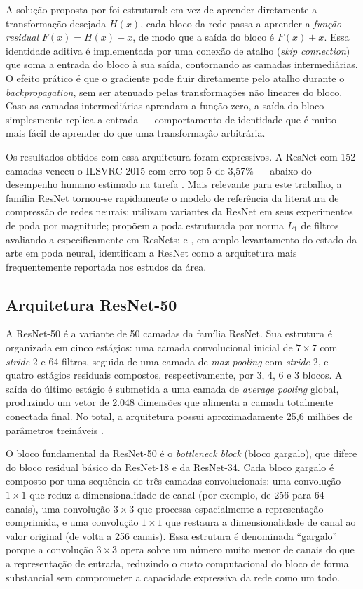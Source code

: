 A solução proposta por  foi estrutural: em vez de aprender diretamente a transformação desejada $H(x)$, cada bloco da rede passa a aprender a \emph{função residual} $F(x) = H(x) - x$, de modo que a saída do bloco é $F(x) + x$. Essa identidade aditiva é implementada por uma conexão de atalho (\textit{skip connection}) que soma a entrada do bloco à sua saída, contornando as camadas intermediárias. O efeito prático é que o gradiente pode fluir diretamente pelo atalho durante o \textit{backpropagation}, sem ser atenuado pelas transformações não lineares do bloco. Caso as camadas intermediárias aprendam a função zero, a saída do bloco simplesmente replica a entrada --- comportamento de identidade que é muito mais fácil de aprender do que uma transformação arbitrária.

Os resultados obtidos com essa arquitetura foram expressivos. A ResNet com 152 camadas venceu o ILSVRC 2015 com erro top-5 de 3,57\% --- abaixo do desempenho humano estimado na tarefa \cite{He2016}. Mais relevante para este trabalho, a família ResNet tornou-se rapidamente o modelo de referência da literatura de compressão de redes neurais:  utilizam variantes da ResNet em seus experimentos de poda por magnitude;  propõem a poda estruturada por norma $L_1$ de filtros avaliando-a especificamente em ResNets; e , em amplo levantamento do estado da arte em poda neural, identificam a ResNet como a arquitetura mais frequentemente reportada nos estudos da área.

\subsection{Arquitetura ResNet-50}\label{subsec:arquitetura_resnet50}

A ResNet-50 é a variante de 50 camadas da família ResNet. Sua estrutura é organizada em cinco estágios: uma camada convolucional inicial de $7 \times 7$ com \textit{stride} 2 e 64 filtros, seguida de uma camada de \textit{max pooling} com \textit{stride} 2, e quatro estágios residuais compostos, respectivamente, por 3, 4, 6 e 3 blocos. A saída do último estágio é submetida a uma camada de \textit{average pooling} global, produzindo um vetor de 2.048 dimensões que alimenta a camada totalmente conectada final. No total, a arquitetura possui aproximadamente 25,6 milhões de parâmetros treináveis \cite{He2016}.

O bloco fundamental da ResNet-50 é o \textit{bottleneck block} (bloco gargalo), que difere do bloco residual básico da ResNet-18 e da ResNet-34. Cada bloco gargalo é composto por uma sequência de três camadas convolucionais: uma convolução $1 \times 1$ que reduz a dimensionalidade de canal (por exemplo, de 256 para 64 canais), uma convolução $3 \times 3$ que processa espacialmente a representação comprimida, e uma convolução $1 \times 1$ que restaura a dimensionalidade de canal ao valor original (de volta a 256 canais). Essa estrutura é denominada ``gargalo'' porque a convolução $3 \times 3$ opera sobre um número muito menor de canais do que a representação de entrada, reduzindo o custo computacional do bloco de forma substancial sem comprometer a capacidade expressiva da rede como um todo.

